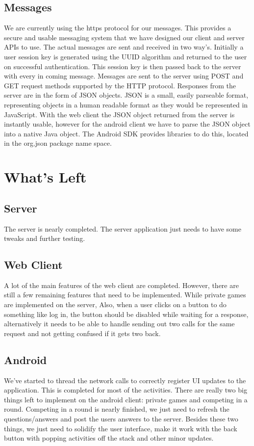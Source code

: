 \documentclass{dependencies/acm_proc_article-sp}
\begin{document}
\subsection {Messages}
We are currently using the https protocol for our messages. This provides a secure
and usable messaging system that we have designed our client and server APIs to use.
The actual messages are sent and received in two way's. Initially a user session key is
generated using the UUID \cite{uuid} algorithm and returned to the user on successful
authentication. This session key is then passed back to the server with every in coming
message. Messages are sent to the server using POST and GET request methods supported
by the HTTP protocol. Responses from the server are in the form of JSON \cite{json} objects.
JSON is a small, easily parseable format, representing objects in a human readable format as
they would be represented in JavaScript. With the web client the JSON object returned from
the server is instantly usable, however for the android client we have to parse the JSON object
into a native Java object. The Android SDK provides libraries to do this, located in the
org.json \cite{orgjson} package name space.

\section {What's Left}
\subsection {Server}
The server is nearly completed. The server application just needs to have some tweaks and further testing.
\subsection {Web Client}
A lot of the main features of the web client are completed.
However, there are still a few remaining features that need to be implemented.
While private games are implemented on the server, 
Also, when a user clicks on a button to do something like log in, the button should be disabled while waiting for a response,
alternatively it needs to be able to handle sending out two calls for the same request and not getting confused if it gets two back.
\subsection {Android}
We've started to thread the network calls to correctly register UI updates to the application. This is completed for most of the activities. There are really two big things left to implement on the android client: private games and competing in a round. Competing in a round is nearly finished, we just need to refresh the questions/answers and post the users answers to the server. Besides these two things, we just need to solidify the user interface, make it work with the back button with popping activities off the stack and other minor updates.
\end{document}
